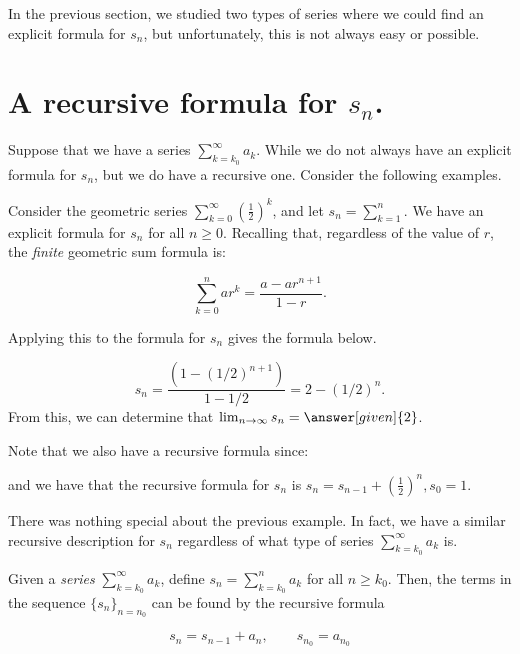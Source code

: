 \documentclass{ximera}
\begin{document}
In the previous section, we studied two types of series where we could find an explicit formula for $s_n$, but unfortunately, this is not always easy or possible.

\section{A recursive formula for $s_n$.}

Suppose that we have a series $\sum_{k=k_0}^{\infty} a_k$.  While we do not always have an explicit formula for $s_n$, but we do have a recursive one.  Consider the following examples.

\begin{example}
Consider the geometric series $\sum_{k=0}^{\infty} \left(\frac{1}{2}\right)^k$, and let $s_n = \sum_{k=1}^{n}$.  We have an explicit formula for $s_n$ for all $n \geq 0$.  Recalling that, regardless of the value of $r$, the \emph{finite} geometric sum formula is: 

\[
\sum_{k=0}^n ar^k = \frac{a-ar^{n+1}}{1-r}.
\]

Applying this to the formula for $s_n$ gives the formula below.

\[
s_n = \frac{\left(1-(1/2)^{n+1}\right)}{1-1/2} = 2-(1/2)^{n}.
\]
From this, we can determine that $\lim_{n \to \infty} s_n =\answer[given]{2}$.

Note that we also have a recursive formula since: 

\begin{image}
  \end{image}
  
and we have that the recursive formula for $s_n$ is $s_n = s_{n-1}+\left(\frac{1}{2}\right)^{n}, s_0 = 1$.  
\end{example}

There was nothing special about the previous example.  In fact, we have a similar recursive description for $s_n$ regardless of what type of series $\sum_{k=k_0}^{\infty} a_k$ is.

\begin{fact}
Given a \emph{series} $\sum_{k=k_0}^{\infty} a_k$, define $s_n = \sum_{k=k_0}^{n} a_k$ for all $n\geq k_0$.  Then, the terms in the sequence $\{s_n\}_{n=n_0}$ can be found by the recursive formula

\[
s_n=s_{n-1}+a_n, \qquad s_{n_0} = a_{n_0}
\]
\end{fact}
\end{document}
